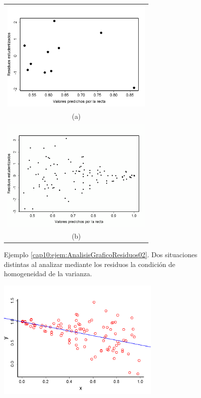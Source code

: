\begin{ejemplo}
\begin{figure}[h!]
\begin{center}
\begin{tabular}{c}
\includegraphics[width=7.5cm]{../fig/Cap10-EjemploAnalisisResiduos04.png}\\
(a)\\
\includegraphics[width=7.5cm]{../fig/Cap10-EjemploAnalisisResiduos05.png}\\
(b)
\end{tabular}
\caption{Ejemplo \ref{cap10:ejem:AnalisisGraficoResiduos02}. Dos situaciones distintas al analizar mediante los residuos la condición de homogeneidad de la varianza.}
\label{cap10:fig:AnalisisMedianteResiduosHomogeneidadVarianza}
\end{center}
\end{figure}
\begin{figure}[h!]
\begin{center}
\begin{enColor}
\includegraphics[width=8cm]{../fig/Cap10-EjemploAnalisisResiduos06.png}

\end{enColor}
\end{center}
\end{figure}
\end{ejemplo}
